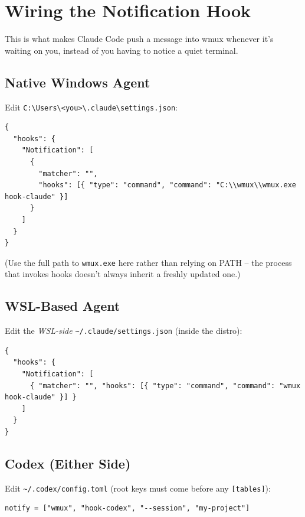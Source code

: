 \documentclass{article}
\begin{document}
\section{Wiring the Notification Hook}

This is what makes Claude Code push a message into wmux whenever it's waiting on you, instead of you having to notice a quiet terminal.

\subsection{Native Windows Agent}

Edit \texttt{C:\textbackslash Users\textbackslash\textless you\textgreater\textbackslash .claude\textbackslash settings.json}:

\begin{lstlisting}
{
  "hooks": {
    "Notification": [
      {
        "matcher": "",
        "hooks": [{ "type": "command", "command": "C:\\wmux\\wmux.exe hook-claude" }]
      }
    ]
  }
}
\end{lstlisting}

(Use the full path to \texttt{wmux.exe} here rather than relying on PATH -- the process that invokes hooks doesn't always inherit a freshly updated one.)

\subsection{WSL-Based Agent}

Edit the \emph{WSL-side} \texttt{\textasciitilde/.claude/settings.json} (inside the distro):

\begin{lstlisting}
{
  "hooks": {
    "Notification": [
      { "matcher": "", "hooks": [{ "type": "command", "command": "wmux hook-claude" }] }
    ]
  }
}
\end{lstlisting}

\subsection{Codex (Either Side)}

Edit \texttt{\textasciitilde/.codex/config.toml} (root keys must come before any \texttt{[tables]}):

\begin{lstlisting}
notify = ["wmux", "hook-codex", "--session", "my-project"]
\end{lstlisting}
\end{document}
